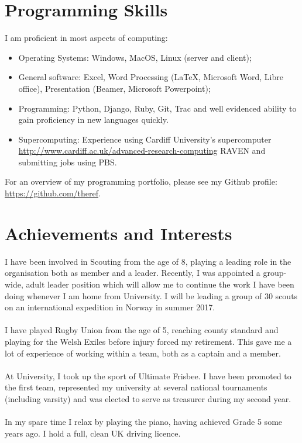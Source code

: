 \documentclass[a4paper]{article}
\begin{document}
\section{Programming Skills}
I am proficient in most aspects of computing:

\begin{itemize}
    \item Operating Systems: Windows, MacOS, Linux (server and client);
    \item General software: Excel, Word Processing (\LaTeX, Microsoft Word, Libre office), Presentation (Beamer, Microsoft Powerpoint);
    \item Programming: Python, Django, Ruby, Git, Trac and well evidenced ability to gain proficiency in new languages quickly.
    \item Supercomputing: Experience using Cardiff University's supercomputer \url{http://www.cardiff.ac.uk/advanced-research-computing} RAVEN and submitting jobs using PBS.
\end{itemize}

For an overview of my programming portfolio, please see my Github profile: \url{https://github.com/theref}.
\section{Achievements and Interests}
I have been involved in Scouting from the age of 8, playing a leading role in the organisation both as member and a leader.
Recently, I was appointed a group-wide, adult leader position which will allow me to continue the work I have been doing whenever I am home from University.
I will be leading a group of 30 scouts on an international expedition in Norway in summer 2017.\\
\\
I have played Rugby Union from the age of 5, reaching county standard and playing for the Welsh Exiles before injury forced my retirement.
This gave me a lot of experience of working within a team, both as a captain and a member. \\
\\
At University, I took up the sport of Ultimate Frisbee. I have been promoted to the first team, represented my university at several national tournaments (including varsity) and was elected to serve as treasurer during my second year. \\
\\
In my spare time I relax by playing the piano, having achieved Grade 5 some years ago. I hold a full, clean UK driving licence.
\end{document}
